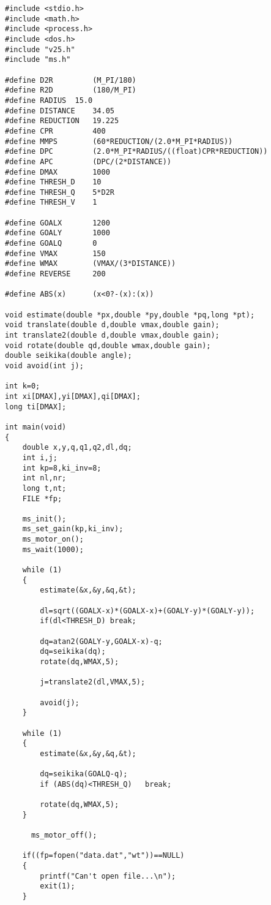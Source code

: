 \begin{lstlisting}[caption=演習21のプログラム,label=s21]
#include <stdio.h>
#include <math.h>
#include <process.h>
#include <dos.h>
#include "v25.h"
#include "ms.h"

#define D2R         (M_PI/180)
#define R2D         (180/M_PI)
#define RADIUS	15.0
#define DISTANCE    34.05
#define REDUCTION   19.225
#define CPR         400
#define MMPS        (60*REDUCTION/(2.0*M_PI*RADIUS))
#define DPC         (2.0*M_PI*RADIUS/((float)CPR*REDUCTION))
#define APC         (DPC/(2*DISTANCE))
#define DMAX        1000
#define THRESH_D    10
#define THRESH_Q    5*D2R
#define THRESH_V    1

#define GOALX       1200
#define GOALY       1000
#define GOALQ       0
#define VMAX        150
#define WMAX        (VMAX/(3*DISTANCE))
#define REVERSE     200

#define ABS(x)      (x<0?-(x):(x))

void estimate(double *px,double *py,double *pq,long *pt);
void translate(double d,double vmax,double gain);
int translate2(double d,double vmax,double gain);
void rotate(double qd,double wmax,double gain);
double seikika(double angle);
void avoid(int j);

int k=0;
int xi[DMAX],yi[DMAX],qi[DMAX];
long ti[DMAX];

int main(void)
{
    double x,y,q,q1,q2,dl,dq;
    int i,j;
    int kp=8,ki_inv=8;
    int nl,nr;
    long t,nt;
    FILE *fp;

    ms_init();
    ms_set_gain(kp,ki_inv);
    ms_motor_on();
    ms_wait(1000);

    while (1)
    {
        estimate(&x,&y,&q,&t);

        dl=sqrt((GOALX-x)*(GOALX-x)+(GOALY-y)*(GOALY-y));
        if(dl<THRESH_D) break;

        dq=atan2(GOALY-y,GOALX-x)-q;
        dq=seikika(dq);
        rotate(dq,WMAX,5);

        j=translate2(dl,VMAX,5);

        avoid(j);
    }

    while (1)
    {
        estimate(&x,&y,&q,&t);

        dq=seikika(GOALQ-q);
        if (ABS(dq)<THRESH_Q)   break;

        rotate(dq,WMAX,5);
    }

      ms_motor_off();

    if((fp=fopen("data.dat","wt"))==NULL)
    {
        printf("Can't open file...\n");
        exit(1);
    }


\end{lstlisting}
